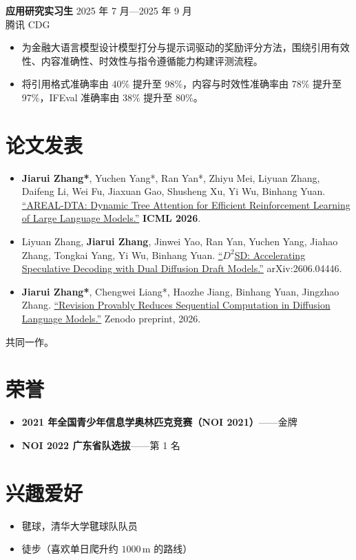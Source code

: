 \documentclass[11pt,a4paper]{article}
\newcommand{\entry}[4]{%
  \textbf{#1} \hfill {\small #2}\\[-1pt]
  #3 \hfill {\small #4}%
}
\begin{document}
\entry{应用研究实习生}{2025 年 7 月—2025 年 9 月}{腾讯 CDG}{}
\begin{itemize}
  \item 为金融大语言模型设计模型打分与提示词驱动的奖励评分方法，围绕引用有效性、内容准确性、时效性与指令遵循能力构建评测流程。
  \item 将引用格式准确率由 40\% 提升至 98\%，内容与时效性准确率由 78\% 提升至 97\%，IFEval 准确率由 38\% 提升至 80\%。
\end{itemize}

\section*{论文发表}
\begin{itemize}
  \item \textbf{Jiarui Zhang*}, Yuchen Yang*, Ran Yan*, Zhiyu Mei, Liyuan Zhang, Daifeng Li, Wei Fu, Jiaxuan Gao, Shusheng Xu, Yi Wu, Binhang Yuan. \href{https://arxiv.org/abs/2602.00482}{``AREAL-DTA: Dynamic Tree Attention for Efficient Reinforcement Learning of Large Language Models.''} \textbf{ICML 2026}.
  \item Liyuan Zhang, \textbf{Jiarui Zhang}, Jinwei Yao, Ran Yan, Yuchen Yang, Jiahao Zhang, Tongkai Yang, Yi Wu, Binhang Yuan. \href{https://arxiv.org/abs/2606.04446}{``$D^2$SD: Accelerating Speculative Decoding with Dual Diffusion Draft Models.''} arXiv:2606.04446.
  \item \textbf{Jiarui Zhang*}, Chengwei Liang*, Haozhe Jiang, Binhang Yuan, Jingzhao Zhang. \href{https://zenodo.org/records/23105365}{``Revision Provably Reduces Sequential Computation in Diffusion Language Models.''} Zenodo preprint, 2026.
\end{itemize}
{\footnotesize * 共同一作。}

\section*{荣誉}
\begin{itemize}
  \item \textbf{2021 年全国青少年信息学奥林匹克竞赛（NOI 2021）}——金牌
  \item \textbf{NOI 2022 广东省队选拔}——第 1 名
\end{itemize}

\section*{兴趣爱好}
\begin{itemize}
  \item 毽球，清华大学毽球队队员
  \item 徒步（喜欢单日爬升约 $1000\,\mathrm{m}$ 的路线）
\end{itemize}
\end{document}
